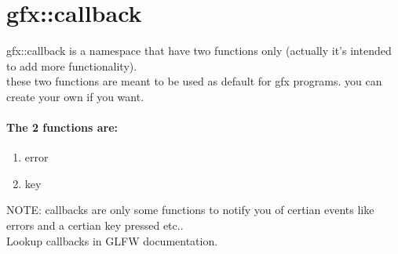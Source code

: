 \section{gfx::callback}
  gfx::callback is a namespace that have two functions only (actually it's intended to add more functionality).\\
  these two functions are meant to be used as default for gfx programs. you can create your own if you want.\\

  \paragraph{The 2 functions are:}
  \begin{enumerate}
    \item{error}
    \item{key}
  \end{enumerate}

  NOTE: callbacks are only some functions to notify you of certian events like errors and a certian key pressed etc..\\
  Lookup callbacks in GLFW documentation.
